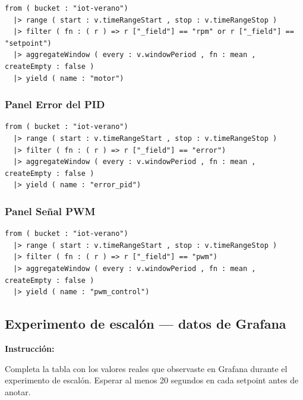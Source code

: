 \documentclass[11pt, letterpaper]{article}
\newenvironment{instruccion}{%
  \begin{mdframed}[backgroundcolor=tealLight,linecolor=tealMain,linewidth=1pt,
    innerleftmargin=10pt,innerrightmargin=10pt,
    innertopmargin=6pt,innerbottommargin=6pt]
  \small\textbf{\color{tealMain}Instrucci\'on:}\hspace{4pt}
}{\end{mdframed}}
\begin{document}
\begin{lstlisting}[style=flux, caption={Consulta Flux --- Panel RPM y Setpoint}]
from ( bucket : "iot-verano")
  |> range ( start : v.timeRangeStart , stop : v.timeRangeStop )
  |> filter ( fn : ( r ) => r ["_field"] == "rpm" or r ["_field"] == "setpoint")
  |> aggregateWindow ( every : v.windowPeriod , fn : mean , createEmpty : false )
  |> yield ( name : "motor")
\end{lstlisting}

\subsubsection{Panel Error del PID}

\begin{lstlisting}[style=flux, caption={Consulta Flux --- Panel Error}]
from ( bucket : "iot-verano")
  |> range ( start : v.timeRangeStart , stop : v.timeRangeStop )
  |> filter ( fn : ( r ) => r ["_field"] == "error")
  |> aggregateWindow ( every : v.windowPeriod , fn : mean , createEmpty : false )
  |> yield ( name : "error_pid")
\end{lstlisting}

\subsubsection{Panel Señal PWM}

\begin{lstlisting}[style=flux, caption={Consulta Flux --- Panel PWM}]
from ( bucket : "iot-verano")
  |> range ( start : v.timeRangeStart , stop : v.timeRangeStop )
  |> filter ( fn : ( r ) => r ["_field"] == "pwm")
  |> aggregateWindow ( every : v.windowPeriod , fn : mean , createEmpty : false )
  |> yield ( name : "pwm_control")
\end{lstlisting}

\subsection{Experimento de escalón --- datos de Grafana}

\begin{instruccion}
  Completa la tabla con los valores reales que observaste en Grafana
  durante el experimento de escal\'on. Esperar al menos 20 segundos
  en cada setpoint antes de anotar.
\end{instruccion}
\end{document}

